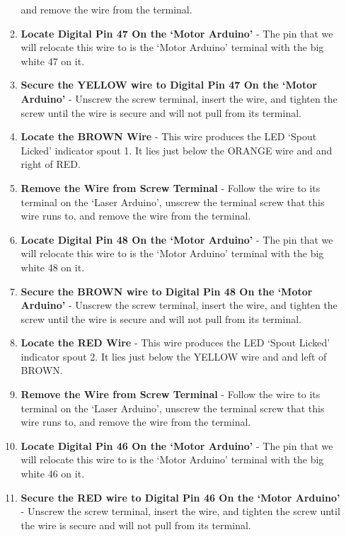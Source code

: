 \documentclass{article}
\begin{document}
\begin{enumerate}
\begin{enumerate}
                and remove the wire from the terminal.
            \item \textbf{Locate Digital Pin 47 On the `Motor Arduino'} - The pin that we will relocate this wire to is the `Motor Arduino' terminal with the big white 47 on it. 
            \item \textbf{Secure the YELLOW wire to Digital Pin 47 On the `Motor Arduino'} - Unscrew the screw terminal, insert the wire, and tighten the screw until the wire is secure
                and will not pull from its terminal.
            \item \textbf{Locate the BROWN Wire} - This wire produces the LED `Spout Licked' indicator spout 1. It lies just below the ORANGE wire and and right of RED.
            \item \textbf{Remove the Wire from Screw Terminal} - Follow the wire to its terminal on the `Laser Arduino', unscrew the terminal screw that this wire runs to, 
                and remove the wire from the terminal.
            \item \textbf{Locate Digital Pin 48 On the `Motor Arduino'} - The pin that we will relocate this wire to is the `Motor Arduino' terminal with the big white 48 on it. 
            \item \textbf{Secure the BROWN wire to Digital Pin 48 On the `Motor Arduino'} - Unscrew the screw terminal, insert the wire, and tighten the screw until the wire is secure
                and will not pull from its terminal.
            \item \textbf{Locate the RED Wire} - This wire produces the LED `Spout Licked' indicator spout 2. It lies just below the YELLOW wire and and left of BROWN.
            \item \textbf{Remove the Wire from Screw Terminal} - Follow the wire to its terminal on the `Laser Arduino', unscrew the terminal screw that this wire runs to, 
                and remove the wire from the terminal.
            \item \textbf{Locate Digital Pin 46 On the `Motor Arduino'} - The pin that we will relocate this wire to is the `Motor Arduino' terminal with the big white 46 on it. 
            \item \textbf{Secure the RED wire to Digital Pin 46 On the `Motor Arduino'} - Unscrew the screw terminal, insert the wire, and tighten the screw until the wire is secure
                and will not pull from its terminal.

        \end{enumerate}
\end{enumerate}
\end{document}
